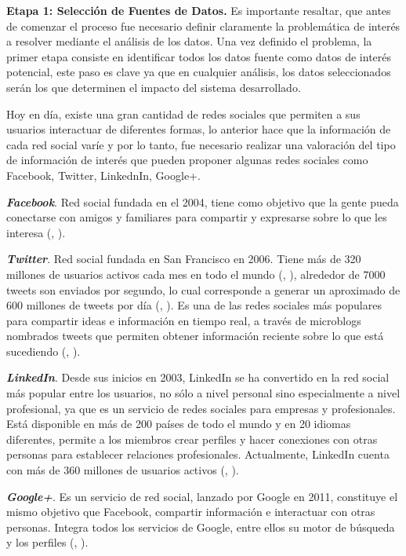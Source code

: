 \textbf{Etapa 1: Selección de Fuentes de Datos.} Es importante resaltar, que antes de comenzar el proceso fue necesario definir claramente la problemática de interés a resolver mediante el análisis de los datos. Una vez definido el problema, la primer etapa consiste en identificar todos los datos fuente como datos de interés potencial, este paso es clave ya que en cualquier análisis, los datos seleccionados serán los que determinen el impacto del sistema desarrollado.

Hoy en día, existe una gran cantidad de redes sociales que permiten a sus usuarios interactuar de diferentes formas, lo anterior hace que la información de cada red social varíe y por lo tanto, fue necesario realizar una valoración del tipo de información de interés que pueden proponer algunas redes sociales como Facebook, Twitter, LinkednIn, Google+.


\textit{\textbf{Facebook}}. Red social fundada en el 2004, tiene como objetivo que la gente pueda conectarse con amigos y familiares para compartir y expresarse sobre lo que les interesa (\citeauthor{facebook_page}, \citeyear{facebook_page}).  

\textit{\textbf{Twitter}}. Red social fundada en San Francisco en 2006. Tiene más de 320 millones de usuarios activos cada mes en todo el mundo (\citeauthor{twitter_page}, \citeyear{twitter_page}), alrededor de 7000 tweets son enviados por segundo, lo cual corresponde a generar un aproximado de 600 millones de tweets por día (\citeauthor{tweets_count}, \citeyear{tweets_count}). Es una de las redes sociales más populares para compartir ideas e información en tiempo real, a través de microblogs nombrados tweets que permiten obtener información reciente sobre lo que está sucediendo (\citeauthor{twitter_page}, \citeyear{twitter_page}).

\textit{\textbf{LinkedIn}}. Desde sus inicios en 2003, LinkedIn se ha convertido en la red social más popular entre los usuarios, no sólo a nivel personal sino especialmente a nivel profesional, ya que es un servicio de redes sociales para empresas y profesionales. Está disponible en más de 200 países de todo el mundo y en 20 idiomas diferentes, permite a los miembros crear perfiles y hacer conexiones con otras personas para establecer relaciones profesionales. Actualmente, LinkedIn cuenta con más de 360 millones de usuarios activos (\citeauthor{linkedin_page}, \citeyear{linkedin_page}).


\textit{\textbf{Google+}}. Es un servicio de red social, lanzado por Google en 2011, constituye el mismo objetivo que Facebook, compartir información e interactuar con otras personas. Integra todos los servicios de Google, entre ellos su motor de búsqueda y los perfiles (\citeauthor{googleplus_page}, \citeyear{googleplus_page}).

